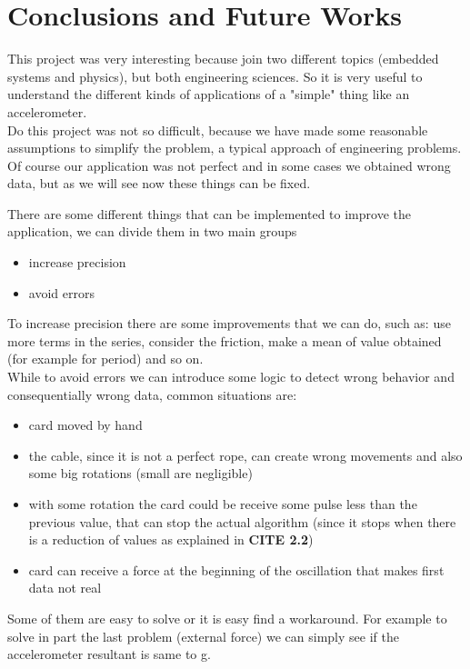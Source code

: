 \section{Conclusions and Future Works}
This project was very interesting because join two different topics (embedded systems and physics), but both engineering sciences. So it is very useful to understand the different kinds of applications of a "simple" thing like an accelerometer.\\
Do this project was not so difficult, because we have made some reasonable assumptions to simplify the problem, a typical approach of engineering problems. Of course our application was not perfect and in some cases we obtained wrong data, but as we will see now these things can be fixed.\par
There are some different things that can be implemented to improve the application, we can divide them in two main groups
\begin{itemize}
	\item increase precision
	\item avoid errors
\end{itemize}
To increase precision there are some improvements that we can do, such as: use more terms in the series, consider the friction, make a mean of value obtained (for example for period) and so on.\\
While to avoid errors we can introduce some logic to detect wrong behavior and consequentially wrong data, common situations are:
\begin{itemize}
	\item card moved by hand
	\item the cable, since it is not a perfect rope, can create wrong movements and also some big rotations (small are negligible)
	\item with some rotation the card could be receive some pulse less than the previous value, that can stop the actual algorithm (since it stops when there is a reduction of values as explained in  \textbf{CITE 2.2})
	\item card can receive a force at the beginning of the oscillation that makes first data not real
\end{itemize}
Some of them are easy to solve or it is easy find a workaround. For example to solve in part the last problem (external force) we can simply see if the accelerometer resultant is same to g.

